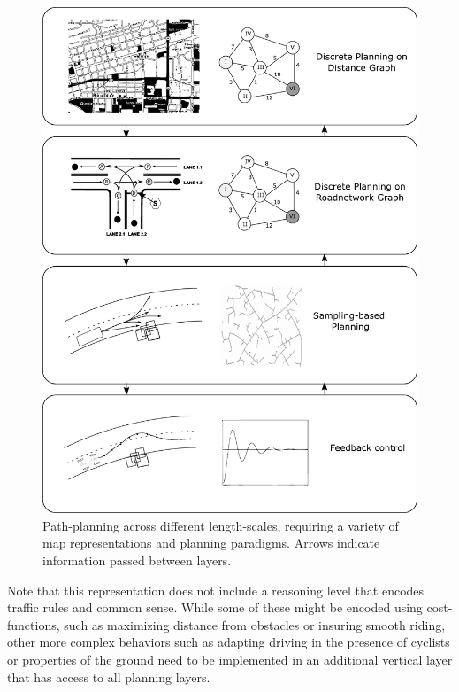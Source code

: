 \begin{figure}
    \centering
    \includegraphics[width=\textwidth]{figs/planninglayers.pdf}
    \caption{Path-planning across different length-scales, requiring a variety of map representations and planning paradigms. Arrows indicate information passed between layers.\label{fig:planninglayers}}
\end{figure}

Note that this representation does not include a reasoning level that encodes traffic rules and common sense. While some of these might be encoded using cost-functions, such as maximizing distance from obstacles or insuring smooth riding, other more complex behaviors such as adapting driving in the presence of cyclists or properties of the ground need to be implemented in an additional vertical layer that has access to all planning layers.


